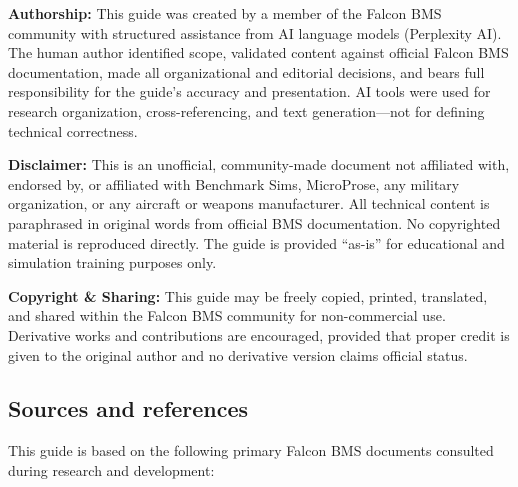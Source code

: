 \documentclass[11pt,a4paper]{article}
\begin{document}
\textbf{Authorship:} This guide was created by a member of the Falcon BMS community with structured assistance from AI language models (Perplexity AI). The human author identified scope, validated content against official Falcon BMS documentation, made all organizational and editorial decisions, and bears full responsibility for the guide's accuracy and presentation. AI tools were used for research organization, cross-referencing, and text generation---not for defining technical correctness.

\textbf{Disclaimer:} This is an unofficial, community-made document not affiliated with, endorsed by, or affiliated with Benchmark Sims, MicroProse, any military organization, or any aircraft or weapons manufacturer. All technical content is paraphrased in original words from official BMS documentation. No copyrighted material is reproduced directly. The guide is provided ``as-is'' for educational and simulation training purposes only.

\textbf{Copyright \& Sharing:} This guide may be freely copied, printed, translated, and shared within the Falcon BMS community for non-commercial use. Derivative works and contributions are encouraged, provided that proper credit is given to the original author and no derivative version claims official status.


\subsection{Sources and references}

This guide is based on the following primary Falcon BMS documents consulted during research and development:
\end{document}
